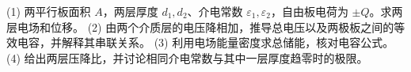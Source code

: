 (1) 两平行板面积 \(A\)，两层厚度 \(d_1,d_2\)、介电常数 \(\varepsilon_1,\varepsilon_2\)，自由板电荷为 \(\pm Q\)。求两层电场和位移。
(2) 由两个介质层的电压降相加，推导总电压以及两极板之间的等效电容，并解释其串联关系。
(3) 利用电场能量密度求总储能，核对电容公式。
(4) 给出两层压降比，并讨论相同介电常数与其中一层厚度趋零时的极限。
